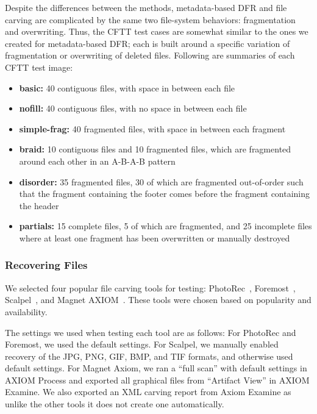 \documentclass{ws-rv9x6}
\newenvironment{paraphrase}{\color{blue}}{\color{black}} %
\begin{document}
Despite the differences between the methods, metadata-based DFR and file carving are complicated by the same two file-system behaviors: fragmentation and overwriting. Thus, the CFTT test cases are somewhat similar to the ones we created for metadata-based DFR; each is built around a specific variation of fragmentation or overwriting of deleted files.
Following are summaries of each CFTT test image:
\begin{itemize}
 \item \textbf{basic:} 40 contiguous files, with space in between each file
 \item \textbf{nofill:} 40 contiguous files, with no space in between each file
 \item \textbf{simple-frag:} 40 fragmented files, with space in between each fragment
 \item \textbf{braid:} 10 contiguous files and 10 fragmented files, which are fragmented around each other in an A-B-A-B pattern
 \item \textbf{disorder:} 35 fragmented files, 30 of which are fragmented out-of-order such that the fragment containing the footer comes before the fragment containing the header
 \item \textbf{partials:} 15 complete files, 5 of which are fragmented, and 25 incomplete files where at least one fragment has been overwritten or manually destroyed

\end{itemize}


\subsubsection{Recovering Files}

 We selected four popular file carving tools for testing: PhotoRec~\cite{photorec}, Foremost~\cite{foremost}, Scalpel~\cite{scalpel}, and Magnet AXIOM~\cite{axiom}.
 \begin{paraphrase}
These tools were chosen based on popularity and availability.
\end{paraphrase}

The settings we used when testing each tool are as follows:
For PhotoRec and Foremost, we used the default settings.
For Scalpel, we manually enabled recovery of the JPG, PNG, GIF, BMP, and TIF formats, and otherwise used default settings.
For Magnet Axiom, we ran a ``full scan'' with default settings in AXIOM Process and exported all graphical files from ``Artifact View'' in AXIOM Examine.
We also exported an XML carving report from Axiom Examine as unlike the other tools it does not create one automatically.
\end{document}

